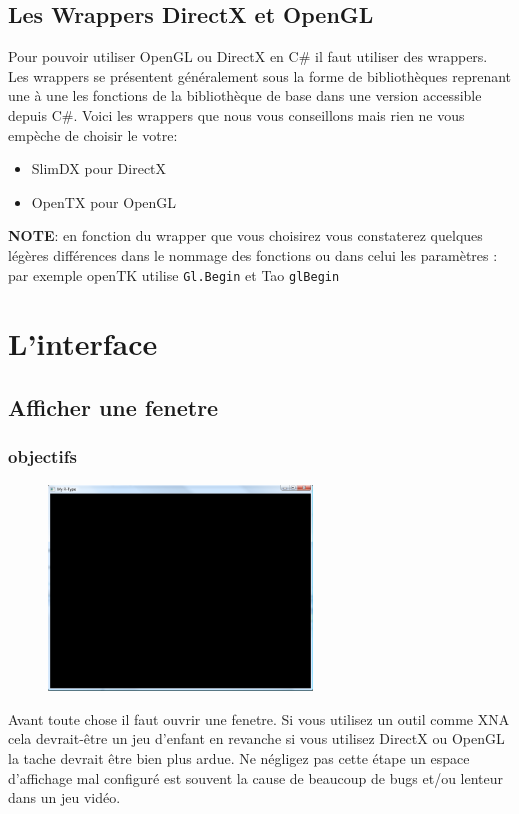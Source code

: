 \documentclass[12pt,a4paper]{report}
\begin{document}
\section{Les Wrappers DirectX et OpenGL}
Pour pouvoir utiliser OpenGL ou DirectX en C\# il faut utiliser des wrappers.
Les wrappers se présentent généralement sous la forme de bibliothèques
reprenant une à une les fonctions de la bibliothèque de base dans une version
accessible depuis C\#. Voici les wrappers que nous vous conseillons mais rien ne
vous empèche de choisir le votre:\\
\begin{itemize}
\item SlimDX pour DirectX
\item OpenTX pour OpenGL\\
\end{itemize}

\textbf{NOTE}: en fonction du wrapper que vous choisirez vous
constaterez quelques légères différences dans le nommage des
fonctions ou dans celui  les paramètres :
par exemple openTK utilise \verb+Gl.Begin+ et Tao \verb+glBegin+

\chapter{L'interface}
\section{Afficher une fenetre}
\subsection{objectifs}
\begin{figure}[!h]\centering\includegraphics[width=7cm]{empty_windows.png}\end{figure}
Avant toute chose il faut ouvrir une fenetre. Si vous utilisez un outil comme XNA cela devrait-être un jeu d'enfant
en revanche si vous utilisez DirectX ou OpenGL la tache devrait être bien plus ardue. Ne négligez pas cette
étape un espace d'affichage mal configuré est souvent la cause de beaucoup de bugs et/ou lenteur
dans un jeu vidéo.
\end{document}
